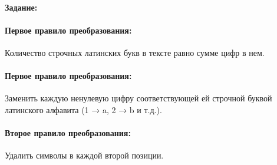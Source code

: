 \paragraph{Задание:}

\paragraph{Первое правило преобразования:}
Количество строчных латинских букв в тексте равно сумме цифр в нем.

\paragraph{Первое правило преобразования:}
Заменить каждую ненулевую цифру соответствующей ей строчной буквой латинского алфавита (1 → a, 2 → b и т.д.).

\paragraph{Второе правило преобразования:}
Удалить символы в каждой второй позиции.




